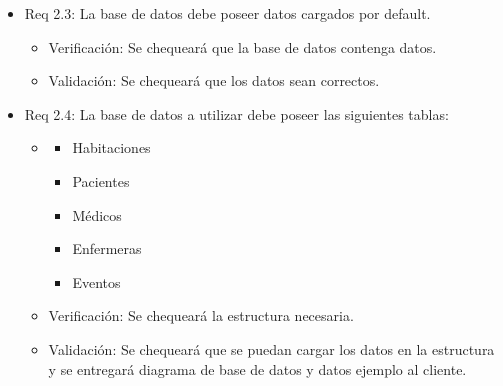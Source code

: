 \documentclass[
11pt, %
]{charter}
\begin{document}
\begin{itemize}
\item Req 2.3: La base de datos debe poseer datos cargados por default.
	\begin{itemize}
	\item Verificación: Se chequeará que la base de datos contenga datos.
	\item Validación: Se chequeará que los datos sean correctos.
	\end{itemize}
	
\item Req 2.4: La base de datos a utilizar debe poseer las siguientes tablas:
			\begin{itemize}
				\item[]
				\begin{itemize}
					\item Habitaciones
					\item Pacientes			
					\item Médicos
					\item Enfermeras			
					\item Eventos 
				\end{itemize}	
			\end{itemize}	
	\begin{itemize}	
	\item Verificación: Se chequeará la estructura necesaria.
	\item Validación: Se chequeará que se puedan cargar los datos en la estructura y se entregará diagrama de base de datos y datos ejemplo al cliente.
	\end{itemize}	



\end{itemize}
\end{document}

